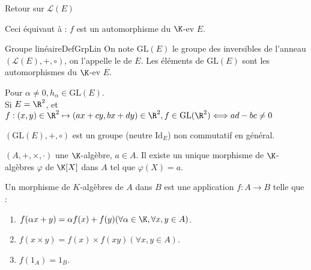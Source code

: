 \documentclass[12pt, a4paper]{report}
\begin{document}
\begin{application}{Retour sur $\mathcal{L}(E)$}{}
\begin{itemize}
	Ceci équivaut à : $f$ est un automorphisme du $\K$-ev $E$. \\
	
	\begin{definition}{Groupe linéaire}{DefGrpLin}
	On note $\text{GL}(E)$ le groupe des inversibles de l'anneau $(\mathcal{L}(E), +, \circ)$, on l'appelle le  de $E$. Les éléments de $\text{GL}(E)$ sont les automorphismes du $\K$-ev $E$.
	\end{definition}
	
	Pour $\alpha \ne 0, h_\alpha \in \text{GL}(E)$. \\
	Si $E = \R^2$, et $f : (x,y) \in \R^2 \mapsto (ax+cy,bx+dy) \in \R^2, f \in \text{GL}(\R^2) \Longleftrightarrow ad-bc \ne 0$
	
	\begin{remarque}[Rappel]{}
	$(\text{GL}(E), +, \circ)$ est un groupe (neutre $\text{Id}_E$) non commutatif en général.
	\end{remarque}
\end{itemize}
\end{application}

\begin{theoreme}{}{}
$(A,+,\times,\cdot)$ une $\K$-algèbre, $a \in A$. Il existe un unique morphisme de $\K$-algèbres $\varphi$ de $\K[X]$ dans $A$ tel que $\varphi(X) = a$.
\end{theoreme}

Un morphisme de $K$-algèbres de $A$ dans $B$ est une application $f : A \longrightarrow B$ telle que : 
\begin{enumerate}
	\item $f(\alpha x + y) = \alpha f(x) + f(y) (\forall \alpha \in \K, \forall x,y \in A)$.
	
	\item $f(x \times y) = f(x) \times f(xy) (\forall x,y \in A)$.
	
	\item $f(1_A) = 1_B$.

\end{enumerate}
\end{document}

